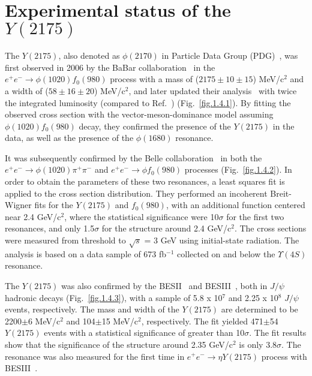 \section{Experimental status of the $Y(2175)$}
\label{p.1.4}

The $Y(2175)$, also denoted as $\phi(2170)$ in Particle Data Group (PDG)~\cite{8}, was first observed in 2006 by the BaBar collaboration~\cite{16} in the $e^{+}e^{-}\rightarrow \phi(1020)f_0(980)$ process with a mass of ($2175 \pm 10 \pm 15$) MeV/c$^2$ and a width of ($58 \pm 16 \pm 20$) MeV/c$^2$, and later updated their analysis~\cite{17} with twice the integrated luminosity (compared to Ref.~\cite{16}) (Fig.~\ref{fig.1.4.1}). By fitting the observed cross section with the vector-meson-dominance model assuming $\phi(1020)f_0(980)$ decay, they confirmed the presence of the $Y(2175)$ in the data, as well as the presence of the $\phi(1680)$ resonance.
~\par It was subsequently confirmed by the Belle collaboration~\cite{18} in both the $e^{+}e^{-}\rightarrow \phi(1020)\pi^{+}\pi^{-}$ and $e^{+}e^{-}\rightarrow \phi f_0(980)$ processes (Fig.~\ref{fig.1.4.2}). In order to obtain the parameters of these two resonances, a least squares fit is applied to the cross section distribution. They performed an incoherent Breit-Wigner fits for the  $Y(2175)$ and $f_0(980)$, with an additional function centered near 2.4 GeV/c$^2$, where the statistical significance were 10$\sigma$ for the first two resonances, and only 1.5$\sigma$ for the structure around 2.4 GeV/c$^2$. The cross sections were measured from threshold to $\sqrt{s}$ = 3 GeV using initial-state radiation. The analysis is based on a data sample of 673 fb$^{-1}$ collected on and below the $\Upsilon(4S)$ resonance.
~\par The $Y(2175)$ was also confirmed by the BESII~\cite{19} and BESIII~\cite{20}, both in $J/\psi$ hadronic decays (Fig.~\ref{fig.1.4.3}), with a sample of 5.8 x 10$^7$ and 2.25 x 10$^8$ $J/\psi$ events, respectively. The mass and width of the $Y(2175)$ are determined to be 2200$\pm$6 MeV/c$^2$ and 104$\pm$15 MeV/c$^2$, respectively. The fit yielded 471$\pm$54 $Y(2175)$ events with a statistical significance of greater than 10$\sigma$. The fit results show that the significance of the structure around 2.35 GeV/c$^2$ is only 3.8$\sigma$. The resonance was also measured for the first time in $e^{+}e^{-}\rightarrow \eta Y(2175)$ process with BESIII~\cite{21}.
